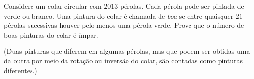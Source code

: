 Considere um colar circular com \({2013}\) pérolas. Cada pérola pode ser pintada de verde ou branco. Uma pintura do colar é chamada de \textit{boa} se entre quaisquer \({21}\) pérolas sucessivas houver pelo menos uma pérola verde. Prove que o número de boas pinturas do colar é ímpar.

(Duas pinturas que diferem em algumas pérolas, mas que podem ser obtidas uma da outra por meio da rotação ou inversão do colar, são contadas como pinturas diferentes.)
